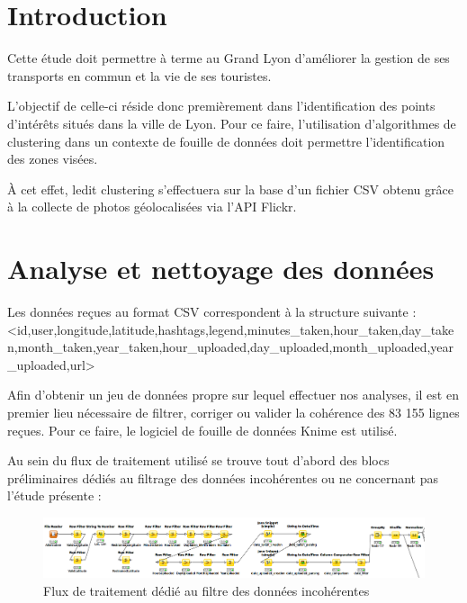 \usepackage{listings}
\usepackage{color}



\section{Introduction}
Cette étude doit permettre à terme au Grand Lyon d'améliorer la gestion de ses transports en commun et la vie de ses touristes.

L'objectif de celle-ci réside donc premièrement dans l'identification des points d'intérêts situés dans la ville de Lyon. Pour ce faire, l'utilisation d'algorithmes de clustering dans un contexte de fouille de données doit permettre l'identification des zones visées.

À cet effet, ledit clustering s'effectuera sur la base d'un fichier CSV obtenu grâce à la collecte de photos géolocalisées via l'API Flickr.
\pagebreak


\section{Analyse et nettoyage des données}
Les données reçues au format CSV correspondent à la structure suivante :
<id,user,longitude,latitude,hashtags,legend,minutes_taken,hour_taken,day_taken,month_taken,year_taken,hour_uploaded,day_uploaded,month_uploaded,year_uploaded,url>

Afin d'obtenir un jeu de données propre sur lequel effectuer nos analyses, il est en premier lieu nécessaire de filtrer, corriger ou valider la cohérence des 83 155 lignes reçues. Pour ce faire, le logiciel de fouille de données Knime est utilisé.

Au sein du flux de traitement utilisé se trouve tout d'abord des blocs préliminaires dédiés au filtrage des données incohérentes ou ne concernant pas l'étude présente :

\begin{figure}[h!]
    \centering
    \includegraphics[width=\linewidth]{img/knime_filter.png}
    \caption{Flux de traitement dédié au filtre des données incohérentes}
    \label{knime_filter}
\end{figure}

